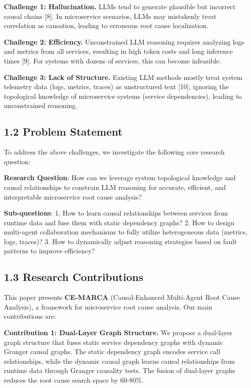 \textbf{Challenge 1: Hallucination.} LLMs tend to generate plausible but
incorrect causal chains {[}8{]}. In microservice scenarios, LLMs may
mistakenly treat correlation as causation, leading to erroneous root
cause localization.

\textbf{Challenge 2: Efficiency.} Unconstrained LLM reasoning requires
analyzing logs and metrics from all services, resulting in high token
costs and long inference times {[}9{]}. For systems with dozens of
services, this can become infeasible.

\textbf{Challenge 3: Lack of Structure.} Existing LLM methods mostly
treat system telemetry data (logs, metrics, traces) as unstructured text
{[}10{]}, ignoring the topological knowledge of microservice systems
(service dependencies), leading to unconstrained reasoning.

\hypertarget{problem-statement}{%
\subsection{1.2 Problem Statement}\label{problem-statement}}

To address the above challenges, we investigate the following core
research question:

\textbf{Research Question}: How can we leverage system topological
knowledge and causal relationships to constrain LLM reasoning for
accurate, efficient, and interpretable microservice root cause analysis?

\textbf{Sub-questions}: 1. How to learn causal relationships between
services from runtime data and fuse them with static dependency graphs?
2. How to design multi-agent collaboration mechanisms to fully utilize
heterogeneous data (metrics, logs, traces)? 3. How to dynamically adjust
reasoning strategies based on fault patterns to improve efficiency?

\hypertarget{research-contributions}{%
\subsection{1.3 Research Contributions}\label{research-contributions}}

This paper presents \textbf{CE-MARCA} (Causal-Enhanced Multi-Agent Root
Cause Analysis), a framework for microservice root cause analysis. Our
main contributions are:

\textbf{Contribution 1: Dual-Layer Graph Structure.} We propose a
dual-layer graph structure that fuses static service dependency graphs
with dynamic Granger causal graphs. The static dependency graph encodes
service call relationships, while the dynamic causal graph learns causal
relationships from runtime data through Granger causality tests. The
fusion of dual-layer graphs reduces the root cause search space by
60-80\%.

